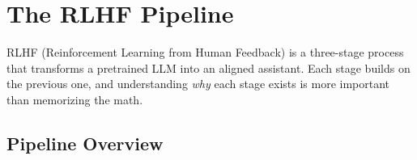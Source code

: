 \section{The RLHF Pipeline}
\label{sec:rlhf_pipeline}

RLHF (Reinforcement Learning from Human Feedback) is a three-stage process that transforms a pretrained LLM into an aligned assistant. Each stage builds on the previous one, and understanding \textit{why} each stage exists is more important than memorizing the math.

\subsection{Pipeline Overview}

